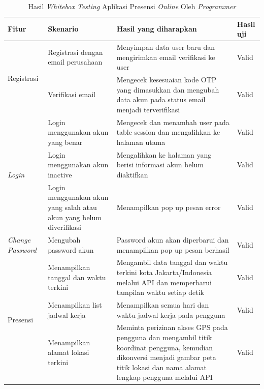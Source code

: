 \begin{longtable}{ |p{3cm}|p{4cm}|p{4cm}|p{2cm}|}
\caption{Hasil \textit{Whitebox Testing} Aplikasi Presensi \textit{Online} Oleh \textit{Programmer}}\label{tab:table-whitebox-testing-aplikasi-presensi-online-oleh-programmer}
\\
\hline
\textbf{Fitur}
&\textbf{Skenario}
&\textbf{Hasil yang diharapkan}
&\textbf{Hasil uji}
\\ 
\hline

\multirow{2}{*}{Registrasi}
&Registrasi dengan email perusahaan
&Menyimpan data user baru dan mengirimkan email verifikasi ke user
&Valid
\\

\cline{2-4}
&Verifikasi email
&Mengecek kesesuaian kode OTP yang dimasukkan dan mengubah data akun pada status email menjadi terverifikasi
&Valid
\\

\hline

\multirow{3}{*}{\textit{Login}}
&Login menggunakan akun yang benar
&Mengecek dan menambah user pada table session dan mengalihkan ke halaman utama
&Valid
\\

\cline{2-4}
&Login menggunakan akun inactive
&Mengalihkan ke halaman yang berisi informasi akun belum diaktifkan
&Valid
\\

\cline{2-4}
&Login menggunakan akun yang salah atau akun yang belum diverifikasi
&Menampilkan pop up pesan error
&Valid
\\

\hline

\multirow{1}{*}{\textit{Change Password}}
&Mengubah password akun
&Password akun akan diperbarui dan menampilkan pop up pesan berhasil
&Valid
\\
\hline

\multirow{3}{*}{Presensi}
&Menampilkan tanggal dan waktu terkini
&Mengambil data tanggal dan waktu terkini kota Jakarta/Indonesia melalui API dan  memperbarui tampilan waktu setiap detik
&Valid
\\

\cline{2-4}
&Menampilkan list jadwal kerja
&Menampilkan semua hari dan waktu jadwal kerja pada pengguna
&Valid
\\

\cline{2-4}
&Menampilkan alamat lokasi terkini
&Meminta perizinan akses GPS pada pengguna dan mengambil titik koordinat pengguna, kemudian dikonversi menjadi gambar peta titik lokasi dan nama alamat lengkap pengguna melalui API
&Valid
\\
\hline


\end{longtable}
